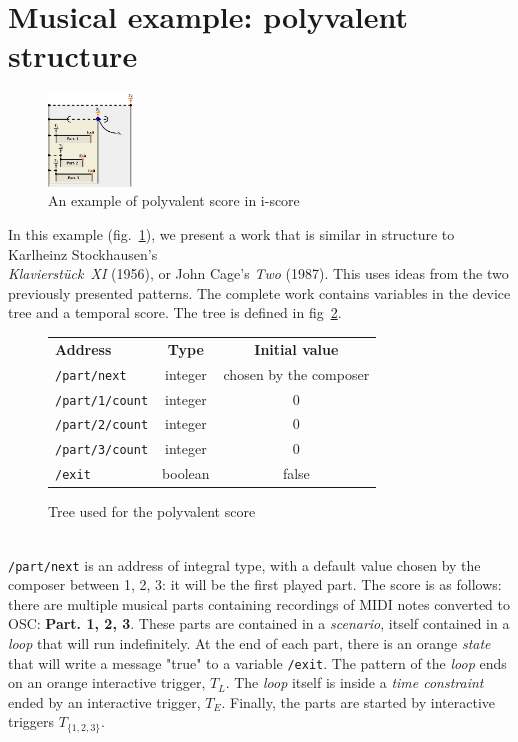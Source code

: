 \documentclass{article}
\newcommand{\scenario}{\textit{scenario}\xspace}
\newcommand{\Loop}{\textit{loop}\xspace}
\newcommand{\state}{\textit{state}\xspace}
\newcommand{\timeconstraint}{\textit{time constraint}\xspace}
\begin{document}
\section{Musical example: polyvalent structure}
\begin{figure}[h]
    \centering
    \includegraphics[width=0.20\textwidth]{images/partition.eps}
    \caption{An example of polyvalent score in i-score}
    \label{fig.polyvalent}
\end{figure}
In this example (fig.~\ref{fig.polyvalent}), we present a work that is similar in structure to Karlheinz Stockhausen's~\\ \emph{Klavierstück~XI} (1956), or John Cage's \emph{Two} (1987). 
This uses ideas from the two previously presented patterns.
The complete work contains variables in the device tree and a temporal score.
The tree is defined in fig~\ref{fig.tablescore}.
\begin{figure}[h]
	\small
    \begin{tabular}{lcc}        
        \textbf{Address} & \textbf{Type} & \textbf{Initial value} \\
        \lstinline|/part/next|    & integer & chosen by the composer \\
        \lstinline|/part/1/count| & integer & 0 \\
        \lstinline|/part/2/count| & integer & 0 \\
        \lstinline|/part/3/count| & integer & 0 \\
        \lstinline|/exit|         & boolean & false
    \end{tabular}
    \caption{Tree used for the polyvalent score}
    \label{fig.tablescore}
\end{figure}~\\
\lstinline{/part/next} is an address of integral type, with a default value chosen by the composer between 1, 2, 3: it will be the first played part. 
The score is as follows: there are multiple musical parts containing recordings of MIDI notes converted to OSC: \textbf{Part. 1, 2, 3}.
These parts are contained in a \scenario, itself contained in a \Loop that will run indefinitely. 
At the end of each part, there is an orange \state that will write a message "true" to a variable \lstinline{/exit}.
The pattern of the \Loop ends on an orange interactive trigger, $T_{L}$.
The \Loop itself is inside a \timeconstraint ended by an interactive trigger, $T_{E}$.
Finally, the parts are started by interactive triggers  $T_{\{1, 2, 3\}}$.
 
\end{document}
